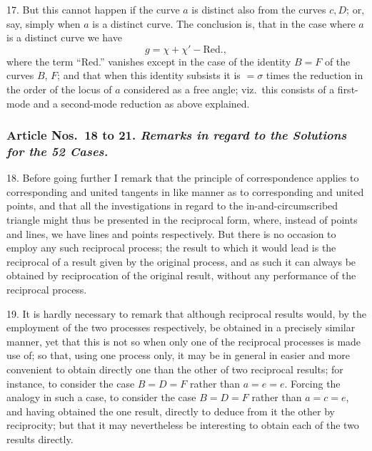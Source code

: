 \documentclass[11pt,a4paper]{book}
\begin{document}
17. But this cannot happen if the curve $a$ is distinct also from the curves $c, D$;
or, say, simply when $a$ is a distinct curve.  The conclusion is, that in the case where
$a$ is a distinct curve we have
\[
g=\chi+\chi'-\text{Red.},
\]
where the term ``Red.'' vanishes except in the case of the identity $B=F$ of the
curves $B$, $F$; and that when this identity subsists it is $=\sigma$ times the reduction in
the order of the locus of $a$ considered as a free angle; viz.\ this consists of a first-
mode and a second-mode reduction as above explained.

\bigskip
\subsubsection*{Article Nos.\ 18 to 21.  \textit{Remarks in regard to the Solutions for the 52 Cases.}}

18. Before going further I remark that the principle of correspondence applies to
corresponding and united tangents in like manner as to corresponding and united
points, and that all the investigations in regard to the in-and-circumscribed triangle
might thus be presented in the reciprocal form, where, instead of points and lines,
we have lines and points respectively.  But there is no occasion to employ any such
reciprocal process; the result to which it would lead is the reciprocal of a result
given by the original process, and as such it can always be obtained by reciprocation
of the original result, without any performance of the reciprocal process.

19. It is hardly necessary to remark that although reciprocal results would, by
the employment of the two processes respectively, be obtained in a precisely similar
manner, yet that this is not so when only one of the reciprocal processes is made
use of; so that, using one process only, it may be in general in easier and more
convenient to obtain directly one than the other of two reciprocal results; for instance,
to consider the case $B=D=F$ rather than $a=e=e$.  Forcing the analogy in such a case,
to consider the case $B=D=F$ rather than $a=c=e$, and having obtained the one result, directly to deduce from it
the other by reciprocity; but that it may nevertheless be interesting to obtain each
of the two results directly.
\end{document}
